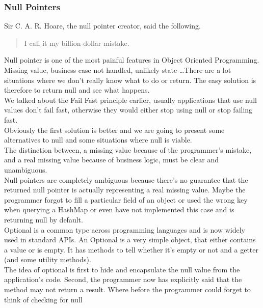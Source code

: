 \subsubsection{Null Pointers}
Sir C. A. R. Hoare, the null pointer creator, said the following.
\begin{quotation}
    I call it my billion-dollar mistake.
\end{quotation}
Null pointer is one of the most painful features in Object Oriented
Programming.
Missing value, business case not handled, unlikely state \ldots There are
a lot situations where we don't really know what to do or return.
The easy solution is therefore to return null and see what happens. \\
We talked about the Fail Fast principle earlier, usually applications
that use null values don't fail fast, otherwise they would either
stop using null or stop failing fast. \\
Obviously the first solution is better and we are going to present some
alternatives to null and some situations where null is viable. \\
\newline
The distinction between, a missing value because of the
programmer's mistake, and a real missing value because of business logic,
must be clear and unambiguous. \\
Null pointers are completely ambiguous because there's no guarantee that
the returned null pointer is actually representing a real missing value.
Maybe the programmer forgot to fill a particular field of an object
or used the wrong key when querying a HashMap or even have not
implemented this case and is returning null by default.
\\
\newline
Optional is a common type across programming languages and is now widely
used in standard APIs.
An Optional is a very simple object, that either contains a value or
is empty.
It has methods to tell whether it's empty or not and a getter (and some
utility methods). \\
The idea of optional is first to hide and encapsulate the null value
from the application's code.
Second, the programmer now has explicitly said that the method may not
return a result.
Where before the programmer could forget to think of checking for null
